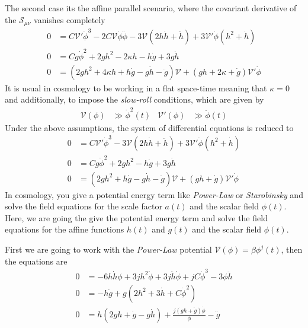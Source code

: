 \documentclass[10pt,a4paper]{article}
\begin{document}
The second case its the affine parallel scenario, where the covariant derivative of the $\mathcal{S}_{\mu\nu}$ vanishes completely
\begin{align}
  0 & = C\mathcal{V}'\dot{\phi}^3-2C\mathcal{V}\dot{\phi}\ddot{\phi} - 3\mathcal{V}\left(2h\dot{h} + \ddot{h}\right) + 3\mathcal{V}'\dot{\phi}
  \left(h^{2} + \dot{h}\right) \\
  0 & = Cg\dot{\phi}^2 + 2gh^2 - 2\kappa h - h\dot{g} + 3g\dot{h} \\
  0 & = \left(2gh^2 + 4\kappa h +h\dot{g} - g \dot{h} - \ddot{g}\right)\mathcal{V} + \left(gh + 2\kappa + \dot{g}\right)\mathcal{V}'\dot{\phi}
\end{align}
It is usual in cosmology to be working in a flat space-time meaning that $\kappa = 0$ and additionally, to impose the \textit{slow-roll} conditions,
which are given by
\begin{align}
  \mathcal{V}(\phi) & \gg \dot{\phi}^{2}(t) & \mathcal{V}'(\phi) & \gg \ddot{\phi}(t)
\end{align}
Under the above assumptions, the system of differential equations is reduced to
\begin{align}
  0 & = C\mathcal{V}'\dot{\phi}^3 - 3\mathcal{V}\left(2h\dot{h} + \ddot{h}\right) + 3\mathcal{V}'\dot{\phi}
  \left(h^{2} + \dot{h}\right) \\
  0 & = Cg\dot{\phi}^2 + 2gh^2  - h\dot{g} + 3g\dot{h} \\
  0 & = \left(2gh^2  +h\dot{g} - g \dot{h} - \ddot{g}\right)\mathcal{V} + \left(gh + \dot{g}\right)\mathcal{V}'\dot{\phi}
\end{align}
In cosmology, you give a potential energy term like \textit{Power-Law} or \textit{Starobinsky} and solve the field equations for the scale factor $a(t)$
and the scalar field $\phi(t)$. Here, we are going the give the potential energy term and solve the field equations for the affine functions
$h(t)$ and $g(t)$ and the scalar field $\phi(t)$.

First we are going to work with the \textit{Power-Law} potential $\mathcal{V}(\phi) = \beta \phi^{j}(t)$, then the equations are
\begin{align}
  0 & = -6h\dot{h}\phi + 3 jh^2 \dot{\phi} + 3j\dot{h}\dot{\phi} + jC\dot{\phi}^3 - 3\phi \ddot{h} \\
  0 & = -h\dot{g} + g\left(2h^2 + 3\dot{h} + C\dot{\phi}^2\right) \\
  0 & = h\left(2gh + \dot{g} - g\dot{h}\right) + \frac{j(gh + \dot{g})\dot{\phi}}{\phi} - \ddot{g}
\end{align}
\end{document}
